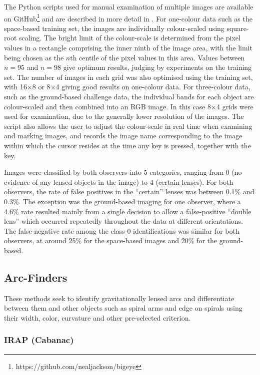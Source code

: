 \documentclass{aa}
\begin{document}
The Python scripts used for manual examination of multiple images are available
on GitHub\footnote{https://github.com/nealjackson/bigeye} and are described in more detail
in \citet{hartley2017support}. For one-colour data such as
the space-based training set, the images are individually colour-scaled using
square-root scaling. The bright limit of the colour-scale is determined
from the pixel values in a rectangle comprising the inner ninth of the
image area, with the limit being chosen as the $n$th centile of the pixel
values in this area. Values between $n=95$ and $n=98$ give optimum results,
judging by experiments on the training set. The number of images in each
grid was also optimised using the training set, with 16$\times$8 or 
8$\times$4 giving good results on one-colour data. For three-colour data,
such as the ground-based challenge data, the individual bands for each 
object are colour-scaled and then combined into an RGB image. In this case
8$\times$4 grids were used for examination, due to the generally lower 
resolution of the images. The script also allows the user to adjust the
colour-scale in real time when examining and marking images, and records
the image name corresponding to the image within which the cursor resides
at the time any key is pressed, together with the key.

Images were classified by both observers into 5 categories, ranging from
0 (no evidence of any lensed objects in the image) to 4 (certain lenses).
For both observers, the rate of false positives in the ``certain'' lenses
was between 0.1\% and 0.3\%. The exception was the ground-based imaging 
for one observer, where a 4.6\% rate resulted mainly from a
single decision to allow a false-positive ``double lens'' which occurred
repeatedly throughout the data at different orientations. The false-negative
rate among the class-0 identifications was similar for both observers, at
around 25\% for the space-based images and 20\% for the ground-based.

\subsection{Arc-Finders}

These methods seek to identify gravitationally lensed arcs and differentiate between them and 
other objects such as spiral arms and edge on spirals using their width, color, curvature and other pre-selected criterion.

\subsubsection{ IRAP (Cabanac)}
\end{document}
